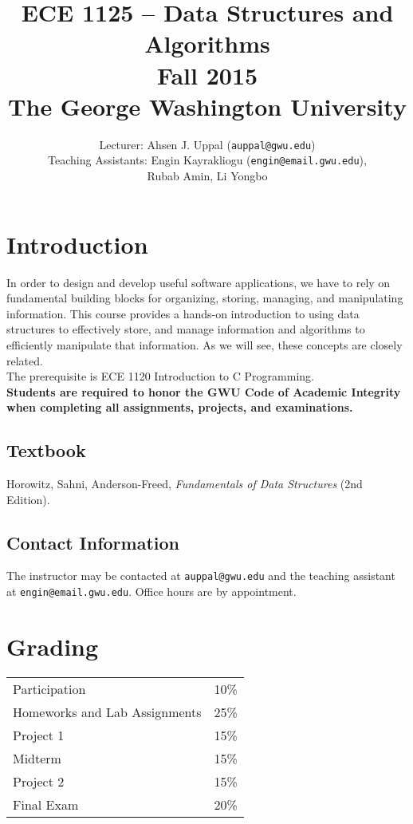 \documentclass{article}
\title{ECE 1125 -- Data Structures and Algorithms \\ Fall 2015 \\ The George Washington University}
\author{Lecturer: Ahsen J. Uppal (\texttt{auppal@gwu.edu})
\\ Teaching Assistants: Engin Kayrakliogu (\texttt{engin@email.gwu.edu}), \\
Rubab Amin, Li Yongbo}
\date{}
\begin{document}
\maketitle

\section{Introduction}
In order to design and develop useful software applications, we have
to rely on fundamental building blocks for organizing, storing,
managing, and manipulating information. This course provides a
hands-on introduction to using data structures to effectively store,
and manage information and algorithms to efficiently manipulate that
information. As we will see, these concepts are closely related.
\\

The prerequisite is ECE 1120 Introduction to C Programming.
\\

\noindent
\textbf{Students are required to honor the GWU Code of Academic Integrity when completing all assignments, projects, and examinations.}

\subsection{Textbook}
Horowitz, Sahni, Anderson-Freed, \textit{Fundamentals of Data Structures} (2nd Edition).

\subsection{Contact Information}
The instructor may be contacted at \texttt{auppal@gwu.edu} and the teaching assistant at \texttt{engin@email.gwu.edu}. Office hours are by appointment.

\section{Grading}
\begin{center}
\begin{tabular}{|l|l|}
\hline
Participation & 10\% \\
Homeworks and Lab Assignments & 25\% \\
Project 1 &     15\% \\
Midterm   &     15\% \\
Project 2 &     15\% \\
Final Exam &    20\% \\
\hline
\end{tabular}
\end{center}
\end{document}

